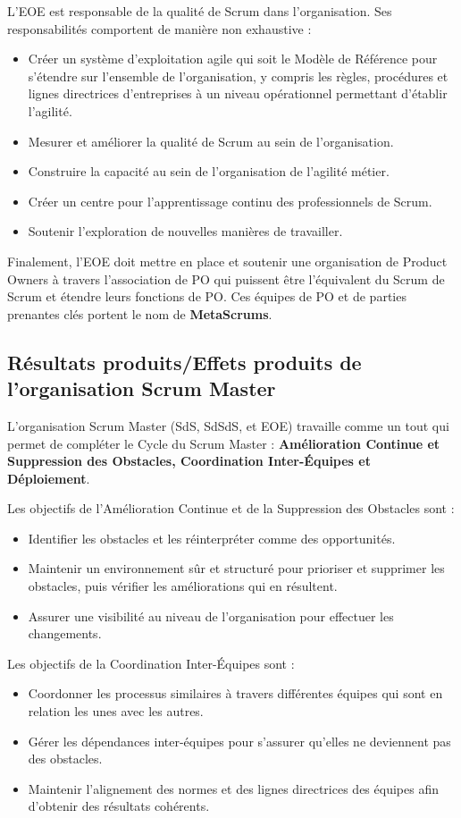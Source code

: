 \documentclass[12pt,a4paper,parskip=full]{scrartcl}
\begin{document}
L’EOE est responsable de la qualité de Scrum dans l’organisation. Ses responsabilités
comportent de manière non exhaustive :
\begin{itemize}
\item Créer un système d’exploitation agile qui soit le Modèle de Référence pour
s’étendre sur l’ensemble de l’organisation, y compris les règles, procédures et
lignes directrices d’entreprises à un niveau opérationnel permettant d’établir
l’agilité.
\item Mesurer et améliorer la qualité de Scrum au sein de l’organisation.
\item Construire la capacité au sein de l’organisation de l’agilité métier.
\item Créer un centre pour l’apprentissage continu des professionnels de Scrum.
\item Soutenir l’exploration de nouvelles manières de travailler.
\end{itemize}
Finalement, l’EOE doit mettre en place et soutenir une organisation de Product Owners à
travers l’association de PO qui puissent être l’équivalent du Scrum de Scrum et étendre
leurs fonctions de PO. Ces équipes de PO et de parties prenantes clés portent le nom de
\textbf{MetaScrums}.

\subsection{Résultats produits/Effets produits de l’organisation Scrum
Master}
L’organisation Scrum Master (SdS, SdSdS, et EOE) travaille comme un tout qui permet de
compléter le Cycle du Scrum Master : \textbf{Amélioration Continue et Suppression des
Obstacles, Coordination Inter-Équipes et Déploiement}.

Les objectifs de l’Amélioration Continue et de la Suppression des Obstacles sont :
\begin{itemize}
\item Identifier les obstacles et les réinterpréter comme des opportunités.
\item Maintenir un environnement sûr et structuré pour prioriser et supprimer les
obstacles, puis vérifier les améliorations qui en résultent.
\item Assurer une visibilité au niveau de l’organisation pour effectuer les
changements.
\end{itemize}
Les objectifs de la Coordination Inter-Équipes sont :
\begin{itemize}
\item Coordonner les processus similaires à travers différentes équipes qui sont en
relation les unes avec les autres.
\item Gérer les dépendances inter-équipes pour s’assurer qu’elles ne deviennent pas
des obstacles.
\item Maintenir l’alignement des normes et des lignes directrices des équipes afin
d’obtenir des résultats cohérents.
\end{itemize}
\end{document}
